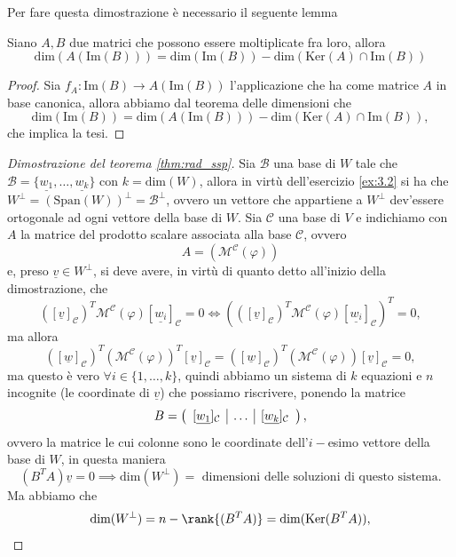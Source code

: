 Per fare questa dimostrazione è necessario il seguente lemma
\begin{lemma}
	Siano $A, B$ due matrici che possono essere moltiplicate fra loro, allora
	$$
		\text{dim}(A(\text{Im}(B))) = \text{dim}(\text{Im}(B)) - \text{dim}(\text{Ker}(A) \cap \text{Im}(B))
	$$
\end{lemma}
\begin{proof}
	Sia $f_A : \text{Im}(B) \to A(\text{Im}(B))$ l'applicazione che ha come matrice $A$ in base canonica, allora abbiamo dal teorema delle dimensioni che
	$$
		\text{dim}(\text{Im}(B)) = \text{dim}(A(\text{Im}(B))) - \text{dim}(\text{Ker}(A) \cap \text{Im}(B)),
	$$
	che implica la tesi.
\end{proof}
\begin{proof}[Dimostrazione del teorema \ref{thm:rad_ssp}]
	Sia $\mathcal{B}$ una base di $W$ tale che $\mathcal{B} = \{ \underline{w_1}, \ldots, \underline{w_k} \}$ con $k = \text{dim}(W)$, allora in virtù dell'esercizio \ref{ex:3.2} si ha che $W^\perp = (\text{Span}(W))^\perp = \mathcal{B}^\perp$, ovvero un vettore che appartiene a $W^\perp$ dev'essere ortogonale ad ogni vettore della base di $W$.
	Sia $\mathcal{C}$ una base di $V$ e indichiamo con $A$ la matrice del prodotto scalare associata alla base $\mathcal{C}$, ovvero
	$$
		A = (\mathcal{M}^\mathcal{C}(\varphi))
	$$
	e, preso $\underline{v} \in W^\perp$, si deve avere, in virtù di quanto detto all'inizio della dimostrazione, che
	$$
		([\underline{v}]_\mathcal{C})^T \mathcal{M}^\mathcal{C}(\varphi) [\underline{w_i}]_\mathcal{C} = 0 \iff (([\underline{v}]_\mathcal{C})^T \mathcal{M}^\mathcal{C}(\varphi) [\underline{w_i}]_\mathcal{C})^T = 0,
	$$
	ma allora
	$$
	([\underline{w}]_\mathcal{C})^T (\mathcal{M}^\mathcal{C}(\varphi))^T [\underline{v}]_\mathcal{C} = ([\underline{w}]_\mathcal{C})^T (\mathcal{M}^\mathcal{C}(\varphi)) [\underline{v}]_\mathcal{C} = 0,
	$$
	ma questo è vero $\forall i \in \{ 1, \ldots, k \}$, quindi abbiamo un sistema di $k$ equazioni e $n$ incognite (le coordinate di $\underline{v}$) che possiamo riscrivere, ponendo la matrice
	$$
		B = \left( \begin{array}{c | c | c}
			[\underline{w_1}]_\mathcal{C} & \ldots & [\underline{w_k}]_\mathcal{C} 
		\end{array} \right),
	$$
	ovvero la matrice le cui colonne sono le coordinate dell'$i-$esimo vettore della base di $W$, in questa maniera
	$$
		(B^T A)\underline{v} = 0 \implies \text{dim}(W^\perp) = \text{ dimensioni delle soluzioni di questo sistema.}
	$$
	Ma abbiamo che
	$$
		\text{dim}(W^\perp) = n - \rank{(B^T A)} = \text{dim}(\text{Ker}(B^T A)),
$$
\end{proof}
